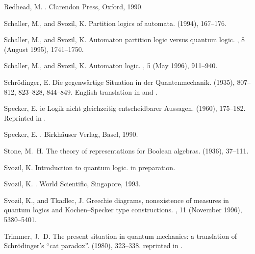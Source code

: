 \begin{thebibliography}{10}
{\sc Redhead, M.}
.
\newblock Clarendon Press, Oxford, 1990.

{\sc Schaller, M., and Svozil, K.}
\newblock Partition logics of automata.
 (1994), 167--176.

{\sc Schaller, M., and Svozil, K.}
\newblock Automaton partition logic versus quantum logic.
, 8 (August
  1995), 1741--1750.

{\sc Schaller, M., and Svozil, K.}
\newblock Automaton logic.
, 5 (May 1996),
  911--940.

{\sc Schr{\"{o}}dinger, E.}
\newblock Die gegenw{\"{a}}rtige {S}ituation in der {Q}uantenmechanik.
 (1935), 807--812, 823--828, 844--849.
\newblock English translation in \cite{trimmer} and \cite[pp.
  152-167]{wheeler-Zurek:83}.

{\sc Specker, E.}
ie {L}ogik nicht gleichzeitig entscheidbarer {A}ussagen.
 (1960), 175--182.
\newblock Reprinted in \cite[pp. 175--182]{specker-ges}.

{\sc Specker, E.}
.
\newblock Birkh{\"{a}}user Verlag, Basel, 1990.

{\sc Stone, M.~H.}
\newblock The theory of representations for {B}oolean algebras.
 (1936),
  37--111.

{\sc Svozil, K.}
\newblock Introduction to quantum logic.
\newblock in preparation.

{\sc Svozil, K.}
.
\newblock World Scientific, Singapore, 1993.

{\sc Svozil, K., and Tkadlec, J.}
\newblock Greechie diagrams, nonexistence of measures in quantum logics and
  {K}ochen--{S}pecker type constructions.
, 11 (November 1996),
  5380--5401.

{\sc Trimmer, J.~D.}
\newblock The present situation in quantum mechanics: a translation of
  {S}chr{\"{o}}dinger's ``cat paradox''.
 (1980), 323--338.
\newblock reprinted in \cite[pp. 152-167]{wheeler-Zurek:83}.


\end{thebibliography}
